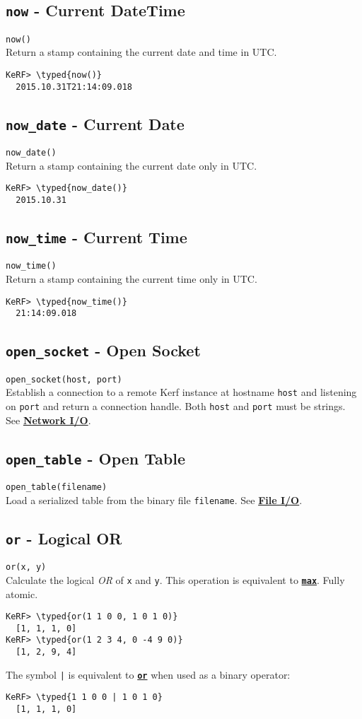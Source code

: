 \documentclass{article}
\newcommand{\typed}[1]{\textcolor{TealBlue}{#1}}
\newcommand{\primdefu}[3]{\subsection{\texttt{#1} - #2}\label{prim:#3}}
\newcommand{\primu}[2]{\hyperref[prim:#2]{\textbf{\texttt{#1}}}}
\newcommand{\primdef}[2]{\primdefu{#1}{#2}{#1}}
\newcommand{\prim}[1]{\primu{#1}{#1}}
\begin{document}
\primdef{now}{Current DateTime}
\texttt{now()}\\

Return a stamp containing the current date and time in UTC.
\begin{Verbatim}
KeRF> \typed{now()}
  2015.10.31T21:14:09.018
\end{Verbatim}

\primdefu{now\_date}{Current Date}{nowDate}
\texttt{now\_date()}\\

Return a stamp containing the current date only in UTC.
\begin{Verbatim}
KeRF> \typed{now_date()}
  2015.10.31
\end{Verbatim}

\primdefu{now\_time}{Current Time}{nowTime}
\texttt{now\_time()}\\

Return a stamp containing the current time only in UTC.
\begin{Verbatim}
KeRF> \typed{now_time()}
  21:14:09.018
\end{Verbatim}

\primdefu{open\_socket}{Open Socket}{openSocket}
\texttt{open\_socket(host, port)}\\

Establish a connection to a remote Kerf instance at hostname \texttt{host} and listening on \texttt{port} and return a connection handle. Both \texttt{host} and \texttt{port} must be strings. See \hyperref[sec:netio]{\textbf{Network I/O}}.

\primdefu{open\_table}{Open Table}{openTable}
\texttt{open\_table(filename)}\\

Load a serialized table from the binary file \texttt{filename}. See \hyperref[sec:fileio]{\textbf{File I/O}}.

\primdef{or}{Logical OR}
\texttt{or(x, y)}\\

Calculate the logical \emph{OR} of \texttt{x} and \texttt{y}. This operation is equivalent to \prim{max}. Fully atomic.
\begin{Verbatim}
KeRF> \typed{or(1 1 0 0, 1 0 1 0)}
  [1, 1, 1, 0]
KeRF> \typed{or(1 2 3 4, 0 -4 9 0)}
  [1, 2, 9, 4]
\end{Verbatim}

The symbol \texttt{|} is equivalent to \prim{or} when used as a binary operator:
\begin{Verbatim}
KeRF> \typed{1 1 0 0 | 1 0 1 0}
  [1, 1, 1, 0]
\end{Verbatim}
\end{document}
